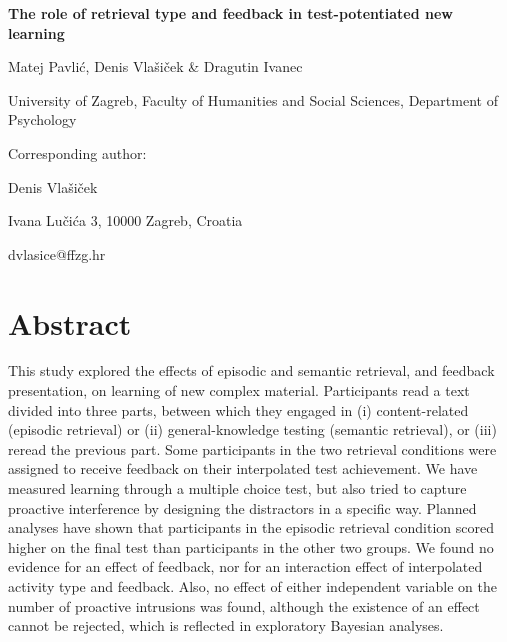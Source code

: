 \documentclass[12pt]{article}
\def\biblio{}
\begin{document}
\begin{titlepage}
    \begin{center}

        \vspace*{\fill}

        \Large
        \textbf{The role of retrieval type and feedback in test-potentiated new learning }
        \normalsize

        \bigskip
        Matej Pavlić, Denis Vlašiček \& Dragutin Ivanec

        University of Zagreb, Faculty of Humanities and Social Sciences,
        Department of Psychology

        \bigskip

        \raggedright
        Corresponding author:

        Denis Vlašiček

        Ivana Lučića 3, 10000 Zagreb, Croatia

        dvlasice@ffzg.hr

        \vspace*{\fill}

    \end{center}

\end{titlepage}

\def\biblio{}

\hypertarget{abstract}{%
\section{Abstract}}

This study explored the effects of episodic and semantic retrieval, and
feedback presentation, on learning of new complex material. Participants
read a text divided into three parts, between which they engaged in
(i) content-related (episodic retrieval) or (ii) general-knowledge testing
(semantic retrieval), or (iii) reread the previous part. Some participants in
the two retrieval conditions were assigned to receive feedback on their
interpolated test achievement. We have measured learning through a multiple
choice test, but also tried to capture proactive interference by designing the
distractors in a specific way. Planned analyses have shown that participants in
the episodic retrieval condition scored higher on the final test than
participants in the other two groups. We found no evidence for an effect of
feedback, nor for an interaction effect of interpolated activity type and
feedback. Also, no effect of either independent variable on the number of
proactive intrusions was found, although the existence of an effect cannot be
rejected, which is reflected in exploratory Bayesian analyses.
\end{document}
